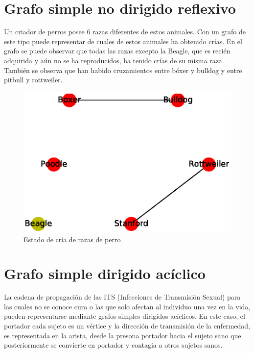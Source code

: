\documentclass{article}
\begin{document}
\section{Grafo simple no dirigido reflexivo}

Un criador de perros posee 6 razas diferentes de estos animales. Con un grafo de este tipo puede representar de cuales de estos animales ha obtenido crías.
En el grafo se puede observar que todas las razas excepto la Beagle, que es recién adquirida y aún no se ha reproducidos, ha tenido crías de su misma raza. También se observa que han habido cruzamientos entre bóxer y bulldog y entre pitbull y rottweiler.



\begin{figure}
  \includegraphics[width=.8\columnwidth]{3.eps}
  \caption{Estado de cría de razas de perro}
  \label{fig:3}
\end{figure}
\section{Grafo simple dirigido acíclico}

La cadena de propagación de las ITS (Infecciones de Transmisión Sexual) para las cuales no se conoce cura o las que solo afectan al individuo una vez en la vida, pueden representarse mediante grafos simples dirigidos acíclicos. En este caso, el portador cada sujeto es un vértice y la dirección de transmisión de la enfermedad, es representada en la arista, desde la presona portador hacia el sujeto sano que posteriormente se convierte en portador y contagia a otros sujetos sanos.
\end{document}
